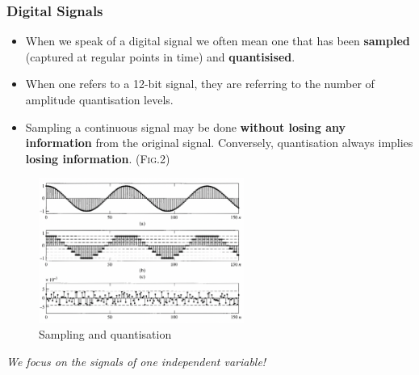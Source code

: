 \subsubsection{Digital Signals}
 \begin{itemize}
    \item When we speak of a digital signal we often mean one that has been \textbf{sampled} (captured at regular points in time) and \textbf{quantisised}.
    
    \item When one refers to a 12-bit signal, they are referring to the number of amplitude quantisation levels.
    
    \item Sampling a continuous signal may be done \textbf{without losing any information} from the original signal. Conversely, quantisation always implies \textbf{losing information}. (\textsc{Fig.2})
 \end{itemize}
 \begin{figure}[h!]\centering
    \includegraphics[width = 0.6\textwidth]{images/1.2.1}
    \caption{Sampling and quantisation}
 \end{figure}
 \textit{We focus on the signals of one independent variable!}
 
